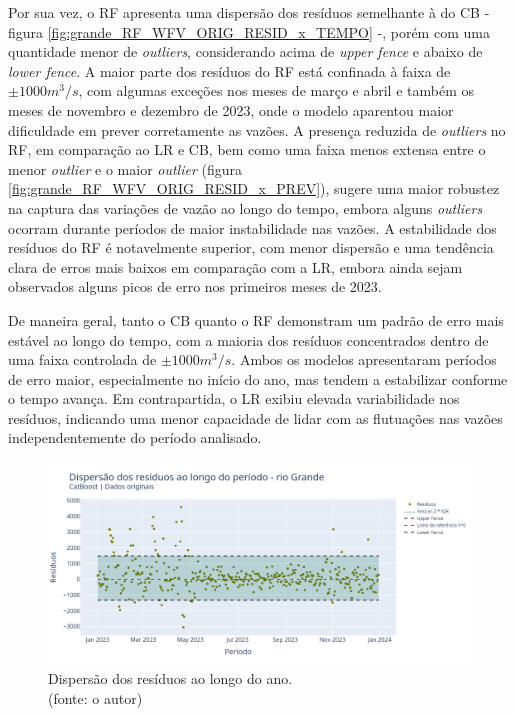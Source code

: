 Por sua vez, o RF apresenta uma dispersão dos resíduos semelhante à do CB - figura \ref{fig:grande_RF_WFV_ORIG_RESID_x_TEMPO} -, porém com uma quantidade menor de \textit{outliers}, considerando acima de \textit{upper fence} e abaixo de \textit{lower fence}. A maior parte dos resíduos do RF está confinada à faixa de $\pm 1000 m^3/s$, com algumas exceções nos meses de março e abril e também os meses de novembro e dezembro de 2023, onde o modelo aparentou maior dificuldade em prever corretamente as vazões. A presença reduzida de \textit{outliers} no RF, em comparação ao LR e CB, bem como uma faixa menos extensa entre o menor \textit{outlier} e o maior \textit{outlier} (figura \ref{fig:grande_RF_WFV_ORIG_RESID_x_PREV}), sugere uma maior robustez na captura das variações de vazão ao longo do tempo, embora alguns \textit{outliers} ocorram durante períodos de maior instabilidade nas vazões. A estabilidade dos resíduos do RF é notavelmente superior, com menor dispersão e uma tendência clara de erros mais baixos em comparação com a LR, embora ainda sejam observados alguns picos de erro nos primeiros meses de 2023.

De maneira geral, tanto o CB quanto o RF demonstram um padrão de erro mais estável ao longo do tempo, com a maioria dos resíduos concentrados dentro de uma faixa controlada de $\pm 1000 m^3/s$. Ambos os modelos apresentaram períodos de erro maior, especialmente no início do ano, mas tendem a estabilizar conforme o tempo avança. Em contrapartida, o LR exibiu elevada variabilidade nos resíduos, indicando uma menor capacidade de lidar com as flutuações nas vazões independentemente do período analisado.

\begin{figure}[!h]
\centering
\includegraphics[scale=0.33]{Figuras/rio_grande/wfv/CB/CB_WFV_ORIG_RESID_x_TEMPO.png}
\caption{Dispersão dos resíduos ao longo do ano.\\(fonte: o autor)}
\label{fig:grande_CB_WFV_ORIG_RESID_x_TEMPO}
\end{figure}

